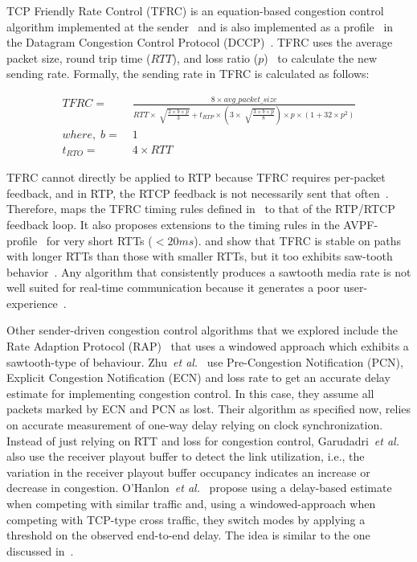 TCP Friendly Rate Control (TFRC) is an equation-based congestion control
algorithm implemented at the sender~\cite{tfrc_347397} and is also implemented
as a profile~\cite{rfc4342} in the Datagram Congestion Control Protocol
(DCCP)~\cite{rfc4340}. TFRC uses the average packet size, round trip time
($RTT$), and loss ratio ($p$)~\cite{rfc3448} to calculate the new sending rate.
Formally, the sending rate in TFRC is calculated as follows:

\begin{align*}
 TFRC = &\; \frac{8 \times avg\_packet\_size}
{RTT \times \sqrt[]{\frac{2 \times b \times p}{3}} + t_{RTP} \times 
\left( 3 \times \sqrt[]{\frac{3 \times b \times p}{8}}\right) \times p \times
\left( 1+32 \times p^2 \right)}\\
where,\; b = &\; 1\\
t_{RTO} = &\; 4 \times RTT
\end{align*}

TFRC cannot directly be applied to RTP because TFRC requires per-packet
feedback, and in RTP, the RTCP feedback is not necessarily sent that
often~\cite{draft.rmcat.feedback}. Therefore, \cite{draft.rtp.tfrc} maps the
TFRC timing rules defined in~\cite{rfc4828, rfc5348} to that of the RTP/RTCP
feedback loop. It also proposes extensions to the timing rules in the
AVPF-profile~\cite{rfc4585} for very short RTTs ($<20ms$).
\cite{Gharai06:ICME} and \cite{VladBalan:2007dq} show that TFRC is stable on
paths with longer RTTs than those with smaller RTTs, but it too exhibits
saw-tooth behavior~\cite{saurin:2006:thesis}. Any algorithm that consistently
produces a sawtooth media rate is not well suited for real-time communication
because it generates a poor user-experience~\cite{Gharai:2002wt,
Zink03subjectiveimpression}.

Other sender-driven congestion control algorithms that we explored include the
Rate Adaption Protocol (RAP)~\cite{rap:752152} that uses a windowed approach which 
exhibits a sawtooth-type of behaviour. Zhu~\textit{et
al.}~\cite{rmcat-nada} use Pre-Congestion Notification (PCN), Explicit
Congestion Notification (ECN) and loss rate to get an accurate delay
estimate for implementing congestion control. In this case, they assume all
packets marked by ECN and PCN as lost. Their algorithm as specified now, 
relies on accurate measurement of one-way delay relying on clock synchronization.
Instead of just relying on RTT and loss for congestion control, 
Garudadri~\textit{et al.}~\cite{4397059} also use the
receiver playout buffer to detect the link utilization, i.e., the variation in the 
receiver playout buffer occupancy indicates an increase or decrease in congestion.
O'Hanlon~\textit{et al.}~\cite{rmcat-dflow} propose using a delay-based
estimate when competing with similar traffic and, using a windowed-approach
when competing with TCP-type cross traffic, they switch modes by applying a
threshold on the observed end-to-end delay. The idea is similar to the one
discussed in~\cite{budzisz2011fair}.




